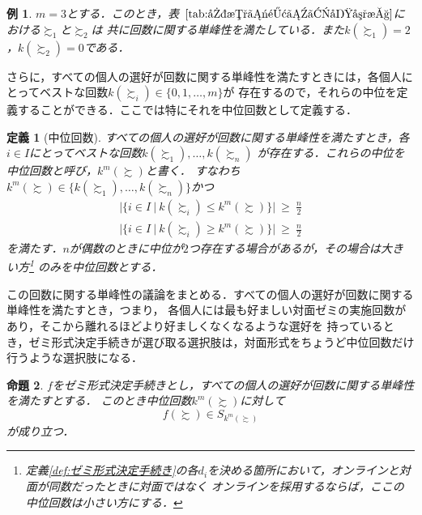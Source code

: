 \documentclass[dvipdfmx]{jsarticle}
\newtheorem{definition}{定義}[section]
\newtheorem{proposition}[definition]{命題}
\newtheorem{example}{例}[section]
\begin{document}
\begin{example}
  $m=3$とする．このとき，表~$\ref{tab:回数に関する単峰性}$における$\succsim_1$と$\succsim_2$は
  共に回数に関する単峰性を満たしている．また$k(\succsim_1) = 2$，$k(\succsim_2) = 0$である．
\end{example}

さらに，すべての個人の選好が回数に関する単峰性を満たすときには，各個人にとってベストな回数$k(\succsim_i) \in \{0,1,\ldots,m\}$が
存在するので，それらの中位を定義することができる．ここでは特にそれを中位回数として定義する．

\begin{definition}[中位回数]\label{def:中位回数}
  すべての個人の選好が回数に関する単峰性を満たすとき，各$i \in I$にとってベストな回数$k(\succsim_1),\ldots,k(\succsim_n)$
  が存在する．これらの中位を中位回数と呼び，$k^m(\succsim)$と書く．
  すなわち$k^m(\succsim) \in \{k(\succsim_1), \ldots, k(\succsim_n) \}$かつ
  \begin{gather*}
    |\{i \in I \ | \ k(\succsim_i) \leq k^m(\succsim) \}| \ \geq \ \frac{n}{2} \\
    |\{i \in I \ | \ k(\succsim_i) \geq k^m(\succsim) \}| \ \geq \ \frac{n}{2}
  \end{gather*}
  を満たす．$n$が偶数のときに中位が$2$つ存在する場合があるが，その場合は大きい方\footnote{
    定義\ref{def:ゼミ形式決定手続き}の各$d_i$を決める箇所において，オンラインと対面が同数だったときに対面ではなく
    オンラインを採用するならば，ここの中位回数は小さい方にする．
  }
  のみを中位回数とする．
\end{definition}

この回数に関する単峰性の議論をまとめる．すべての個人の選好が回数に関する単峰性を満たすとき，つまり，
各個人には最も好ましい対面ゼミの実施回数があり，そこから離れるほどより好ましくなくなるような選好を
持っているとき，ゼミ形式決定手続きが選び取る選択肢は，対面形式をちょうど中位回数だけ行うような選択肢になる．

\begin{proposition}\label{prop:中位回数選択命題}
  $f$をゼミ形式決定手続きとし，すべての個人の選好が回数に関する単峰性を満たすとする．
  このとき中位回数$k^m(\succsim)$に対して
  \[
    f(\succsim) \in S_{k^m(\succsim)}
  \]
  が成り立つ．
\end{proposition}
\end{document}
